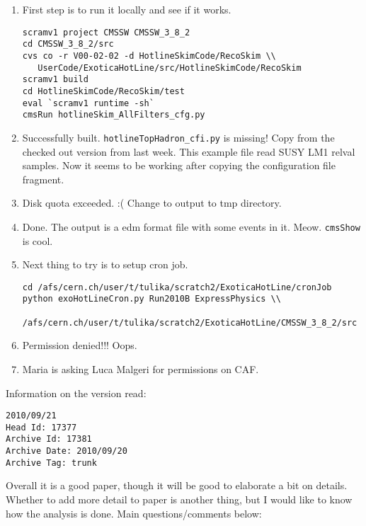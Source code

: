 \begin{enumerate}
\item First step is to run it locally and see if it works.
\begin{verbatim}
scramv1 project CMSSW CMSSW_3_8_2
cd CMSSW_3_8_2/src
cvs co -r V00-02-02 -d HotlineSkimCode/RecoSkim \\
   UserCode/ExoticaHotLine/src/HotlineSkimCode/RecoSkim
scramv1 build
cd HotlineSkimCode/RecoSkim/test
eval `scramv1 runtime -sh`
cmsRun hotlineSkim_AllFilters_cfg.py
\end{verbatim}
\item Successfully built.  \texttt{hotlineTopHadron\_cfi.py} is missing!  Copy from the checked out version from last week.
This example file read SUSY LM1 relval samples.
Now it seems to be working after copying the configuration file fragment.
\item Disk quota exceeded.  :(  Change to output to tmp directory.
\item Done.  The output is a edm format file with some events in it.  Meow.   \texttt{cmsShow} is cool.
\item Next thing to try is to setup cron job.
\begin{verbatim}
cd /afs/cern.ch/user/t/tulika/scratch2/ExoticaHotLine/cronJob
python exoHotLineCron.py Run2010B ExpressPhysics \\
   /afs/cern.ch/user/t/tulika/scratch2/ExoticaHotLine/CMSSW_3_8_2/src 
\end{verbatim}
\item Permission denied!!!  Oops.
\item Maria is asking Luca Malgeri for permissions on CAF.
\end{enumerate}


Information on the version read:
\begin{verbatim}
2010/09/21
Head Id: 17377
Archive Id: 17381
Archive Date: 2010/09/20
Archive Tag: trunk
\end{verbatim}

Overall it is a good paper, though it will be good to elaborate a bit on details.
Whether to add more detail to paper is another thing, but I would like to know how the analysis is done.
Main questions/comments below:


